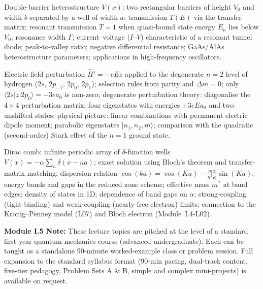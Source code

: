 \documentclass[11pt,a4paper]{article}
\begin{document}
\begin{description}[leftmargin=1.4em, style=nextline, itemsep=6pt]
\item[\textbf{L10 --- The Square Barrier and Resonant Tunnel Diode}]
  Double-barrier heterostructure $V(x)$: two rectangular barriers of height
  $V_0$ and width $b$ separated by a well of width $a$; transmission $T(E)$
  via the transfer matrix; resonant transmission $T=1$ when quasi-bound
  state energy $E_n$ lies below $V_0$; resonance width $\Gamma$;
  current--voltage ($I$--$V$) characteristic of a resonant tunnel diode;
  peak-to-valley ratio; negative differential resistance; GaAs/AlAs
  heterostructure parameters; applications in high-frequency oscillators.

\item[\textbf{L11 --- The Linear Stark Effect in Hydrogen}]
  Electric field perturbation $\hat{H}'=-eEz$ applied to the degenerate
  $n=2$ level of hydrogen ($2s$, $2p_{-1}$, $2p_0$, $2p_1$);
  selection rules from parity and $\Delta m=0$;
  only $\langle 2s|z|2p_0\rangle=-3ea_0$ is non-zero;
  degenerate perturbation theory: diagonalise the $4\times4$ perturbation matrix;
  four eigenstates with energies $\pm3eEa_0$ and two unshifted states;
  physical picture: linear combinations with permanent electric dipole moment;
  parabolic eigenstates $|n_1,n_2,m\rangle$; comparison with the quadratic
  (second-order) Stark effect of the $n=1$ ground state.

\item[\textbf{L12 --- The 1D Dirac Comb and Band Structure}]
  Dirac comb: infinite periodic array of $\delta$-function wells
  $V(x)=-\alpha\sum_n\delta(x-na)$; exact solution using Bloch's theorem and
  transfer-matrix matching; dispersion relation
  $\cos(ka)=\cos(Ka)-\tfrac{m\alpha}{\hbar^2 K}\sin(Ka)$;
  energy bands and gaps in the reduced zone scheme;
  effective mass $m^*$ at band edges; density of states in 1D;
  dependence of band gaps on $\alpha$: strong-coupling (tight-binding)
  and weak-coupling (nearly-free electron) limits;
  connection to the Kronig--Penney model (L07) and Bloch electron (Module~I.4-L02).

\end{description}

\begin{tcolorbox}[highlightbox]
\textbf{Module I.5 Note:} These lecture topics are pitched at the level of a
standard first-year quantum mechanics course (advanced undergraduate).
Each can be taught as a standalone 90-minute worked-example class or
problem session. Full expansion to the standard syllabus format
(90-min pacing, dual-track content, five-tier pedagogy,
Problem Sets A \& B, simple and complex mini-projects) is available on request.
\end{tcolorbox}
\end{document}
